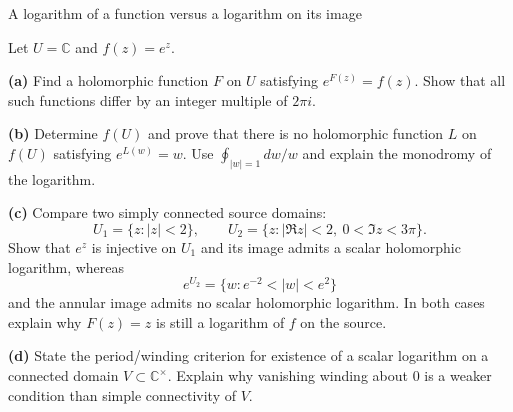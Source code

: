 \begin{problem}[CP-IV-0138]
\label{prob:cp-iv-0138}
A logarithm of a function versus a logarithm on its image

Let $U=\mathbb C$ and $f(z)=e^z$.

\par\noindent\textbf{(a)} Find a holomorphic function $F$ on $U$
satisfying $e^{F(z)}=f(z)$. Show that all such functions differ by
an integer multiple of $2\pi i$.

\par\noindent\textbf{(b)} Determine $f(U)$ and prove that there is
no holomorphic function $L$ on $f(U)$ satisfying $e^{L(w)}=w$.
Use $\oint_{|w|=1}dw/w$ and explain the monodromy of the logarithm.

\par\noindent\textbf{(c)} Compare two simply connected source domains:
\[
U_1=\{z:|z|<2\},\qquad
U_2=\{z:|\Re z|<2,\ 0<\Im z<3\pi\}.
\]
Show that $e^z$ is injective on $U_1$ and its image admits a scalar
holomorphic logarithm, whereas
\[
e^{U_2}=\{w:e^{-2}<|w|<e^2\}
\]
and the annular image admits no scalar holomorphic logarithm.
In both cases explain why $F(z)=z$ is still a logarithm of $f$
on the source.

\par\noindent\textbf{(d)} State the period/winding criterion for
existence of a scalar logarithm on a connected domain
$V\subset\mathbb C^\times$. Explain why vanishing winding about $0$
is a weaker condition than simple connectivity of $V$.
\end{problem}

